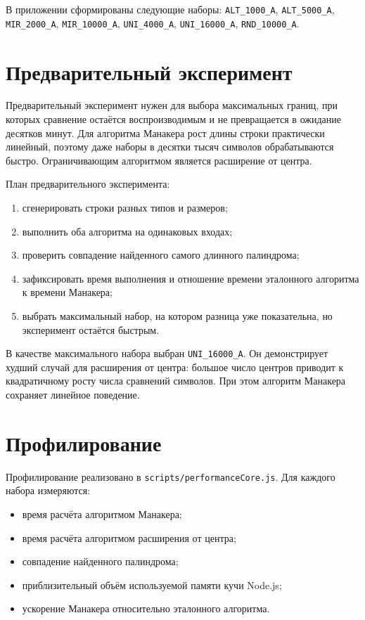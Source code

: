 В приложении сформированы следующие наборы: \texttt{ALT\_1000\_A}, \texttt{ALT\_5000\_A}, \texttt{MIR\_2000\_A}, \texttt{MIR\_10000\_A}, \texttt{UNI\_4000\_A}, \texttt{UNI\_16000\_A}, \texttt{RND\_10000\_A}.

\section{Предварительный эксперимент} \label{ch2:sec4}

Предварительный эксперимент нужен для выбора максимальных границ, при которых сравнение остаётся воспроизводимым и не превращается в ожидание десятков минут. Для алгоритма Манакера рост длины строки практически линейный, поэтому даже наборы в десятки тысяч символов обрабатываются быстро. Ограничивающим алгоритмом является расширение от центра.

План предварительного эксперимента:
\begin{enumerate}
    \item сгенерировать строки разных типов и размеров;
    \item выполнить оба алгоритма на одинаковых входах;
    \item проверить совпадение найденного самого длинного палиндрома;
    \item зафиксировать время выполнения и отношение времени эталонного алгоритма к времени Манакера;
    \item выбрать максимальный набор, на котором разница уже показательна, но эксперимент остаётся быстрым.
\end{enumerate}

В качестве максимального набора выбран \texttt{UNI\_16000\_A}. Он демонстрирует худший случай для расширения от центра: большое число центров приводит к квадратичному росту числа сравнений символов. При этом алгоритм Манакера сохраняет линейное поведение.

\section{Профилирование} \label{ch2:sec5}

Профилирование реализовано в \texttt{scripts/performanceCore.js}. Для каждого набора измеряются:
\begin{itemize}
    \item время расчёта алгоритмом Манакера;
    \item время расчёта алгоритмом расширения от центра;
    \item совпадение найденного палиндрома;
    \item приблизительный объём используемой памяти кучи Node.js;
    \item ускорение Манакера относительно эталонного алгоритма.
\end{itemize}

